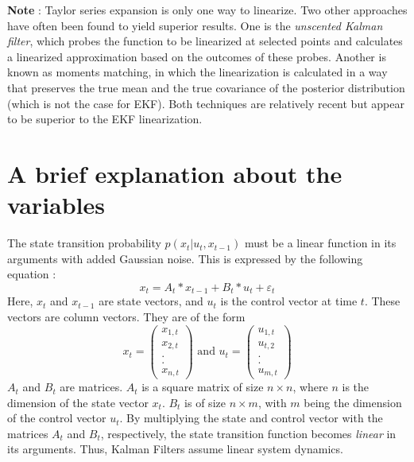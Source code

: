 \documentclass[a4paper,12pt]{extarticle}
\theoremstyle{mytheor}
\begin{document}
\textbf{Note} : Taylor series expansion is only one way to linearize. Two other approaches have often been found to yield superior results. One is the \emph{unscented Kalman filter}, which probes the function to be linearized at selected points and calculates a linearized approximation based on the outcomes of these probes. Another is known as moments matching, in which the linearization is calculated in a way that preserves the true mean and the true covariance of the posterior distribution (which is not the case for EKF). Both techniques are relatively recent but appear to be superior to the EKF linearization. 


\section*{ A brief explanation about the variables }

The state transition probability $ p( x_t | u_t, x_{t-1} ) $ must be a linear function in its arguments with added Gaussian noise. This is expressed by the following equation : 
\begin{equation} \label{eq1}
x_t =  A_t * x_{t-1}  +  B_t * u_t  +  \varepsilon_t
\end{equation}
Here, $x_t$ and $x_{t-1}$ are state vectors, and $u_t$ is the control vector at time $t$. These vectors are column vectors. They are of the form
\begin{equation}
x_t = \left( \begin{array}{c} x_{1,t} \\ x_{2,t} \\ . \\ . \\  x_{n,t} \end{array} \right)
\mbox{~and~}
u_t = \left( \begin{array}{c} u_{1,t} \\ u_{t,2} \\ . \\ . \\ u_{m,t} \end{array} \right)
\end{equation}
$A_t$ and $B_t$ are matrices. $A_t$ is a square matrix of size $ n \times n $, where $n$ is the dimension of the state vector $x_t$. $B_t$ is of size $ n \times m$, with $m$ being the dimension of the control vector $u_t$. By multiplying the state and control vector with the matrices $A_t$ and $B_t$, respectively, the state transition function becomes \emph{linear} in its arguments. Thus, Kalman Filters assume linear system dynamics.
\end{document}
